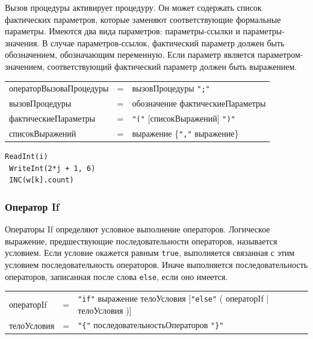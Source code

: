 \documentclass[a4paper,12pt]{article}
\newcommand{\lit}[1]{\texttt{"#1"}}
\begin{document}
    Вызов процедуры активирует процедуру. Он может содержать список фактических параметров, которые заменяют соответствующие формальные параметры. Имеются два вида параметров: параметры-ссылки и параметры-значения. В случае параметров-ссылок, фактический параметр должен быть обозначением, обозначающим переменную. Если параметр является параметром-значением, соответствующий фактический параметр должен быть выражением.

    \begin{center}
        \begin{tabular}{l c l}
            операторВызоваПроцедуры & = & вызовПроцедуры \lit{;} \\
            вызовПроцедуры & = & обозначение фактическиеПараметры \\
            фактическиеПараметры & = & \lit{(} [списокВыражений] \lit{)} \\
            списокВыражений & = & выражение \{\lit{,} выражение\}
        \end{tabular}
    \end{center}

    \begin{center}
        \begin{minipage}[t]{0.5\textwidth}
            \begin{lstlisting}[style=obouldstyle]
 ReadInt(i)
 WriteInt(2*j + 1, 6)
 INC(w[k].count)
            \end{lstlisting}
        \end{minipage}
    \end{center}

    \subsubsection*{Оператор If}

    Операторы If определяют условное выполнение операторов. Логическое выражение, предшествующие последовательности операторов, называется условием. Если условие окажется равным \texttt{true}, выполняется связанная с этим условием последовательность операторов. Иначе выполняется последовательность операторов, записанная после слова \texttt{else}, если оно имеется.

    \begin{center}
        \begin{tabular}{l c l}
            операторIf & = & \lit{if} выражение телоУсловия [\lit{else} ( операторIf | телоУсловия )]\\
            телоУсловия & = & \lit{\{} последовательностьОператоров \lit{\}}
        \end{tabular}
    \end{center}
\end{document}

